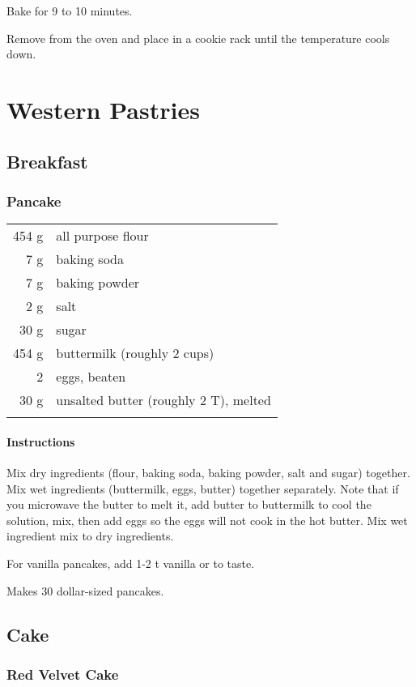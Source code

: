 \documentclass[12pt,landscape,twoside,twocolumn, openright, titlepage, draft]{book}
\begin{document}
\par
Bake for 9 to 10
minutes.  

\par
Remove from the oven and place in a cookie rack until the
temperature cools down.  

\chapter{Western Pastries}
\section{Breakfast}
\subsection{Pancake}
\begin{tabular}{r p{1.5in}}
454 g & all purpose flour \\
  7 g & baking soda \\
  7 g & baking powder \\
  2 g & salt \\
 30 g & sugar \\
454 g & buttermilk (roughly 2 cups) \\
  2   & eggs, beaten \\
 30 g & unsalted butter (roughly 2 T), melted \\ \\
\end{tabular}

\subsubsection{Instructions}

Mix dry ingredients (flour, baking soda, baking powder, salt and sugar)
together. Mix wet ingredients (buttermilk, eggs, butter) together
separately. Note that if you microwave the butter to melt it, add butter to
buttermilk to cool the solution, mix, then add eggs so the eggs will not cook
in the hot butter. Mix wet ingredient mix to dry ingredients. 

For vanilla pancakes, add 1-2 t vanilla or to taste. 

Makes 30 dollar-sized pancakes.

\section{Cake}
\subsection{Red Velvet Cake}
\end{document}
